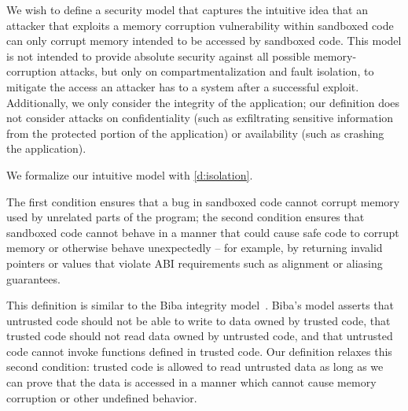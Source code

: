 We wish to define a security model that captures the intuitive idea that an attacker that exploits a
memory corruption vulnerability within sandboxed code can only corrupt memory intended to be
accessed by sandboxed code. This model is not intended to provide absolute security against all possible
memory-corruption attacks, but only on compartmentalization and fault isolation, to mitigate the
access an attacker has to a system after a successful exploit. Additionally, we only consider the
integrity of the application; our definition does not consider attacks on confidentiality (such as
exfiltrating sensitive information from the protected portion of the application) or availability (such
as crashing the application).

We formalize our intuitive model with \autoref{d:isolation}.

\begin{center}
    \centering
    \label{d:isolation}
\end{center}

The first condition ensures that a bug in sandboxed code cannot corrupt memory used by unrelated
parts of the program; the second condition ensures that sandboxed code cannot behave in a manner
that could cause safe code to corrupt memory or otherwise behave unexpectedly -- for example, by
returning invalid pointers or values that violate ABI requirements such as alignment or aliasing
guarantees.

This definition is similar to the Biba integrity model~\cite{biba:integrity}. Biba's model asserts
that untrusted code should not be able to write to data owned by trusted code, that trusted code
should not read data owned by untrusted code, and that untrusted code cannot invoke functions
defined in trusted code. Our definition relaxes this second condition: trusted code is allowed to
read untrusted data as long as we can prove that the data is accessed in a manner which cannot cause
memory corruption or other undefined behavior.

